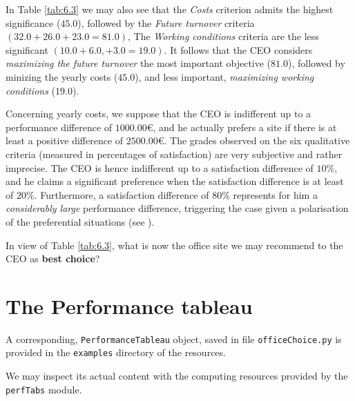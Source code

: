 In Table \ref{tab:6.3} we may also see that the \emph{Costs} criterion admits the highest significance ($45.0$), followed by the \emph{Future turnover} criteria $(32.0 + 26.0 + 23.0 = 81.0)$, The \emph{Working conditions} criteria are the less significant $(10.0 + 6.0, + 3.0 = 19.0)$. It follows that the CEO considers \emph{maximizing the future turnover} the most important objective ($81.0$), followed by minizing the yearly costs ($45.0$), and less important, \emph{maximizing working conditions} ($19.0$). 

Concerning yearly costs, we suppose that the CEO is indifferent up to a performance difference of $1000.00$€, and he actually prefers a site if there is at least a positive difference of $2500.00$€. The grades observed on the six qualitative criteria (measured in percentages of satisfaction) are very subjective and rather imprecise. The CEO is hence indifferent up to a satisfaction difference of $10\%$, and he claims a significant preference when the satisfaction difference is at least of $20\%$.  Furthermore, a satisfaction difference of $80\%$ represents for him a \emph{considerably large} performance difference, triggering the case given a polarisation of the preferential situations (see \citep{BIS-2013}). 

In view of Table \ref{tab:6.3}, what is now the office site we may recommend to the CEO as \textbf{best choice}?

\section{The \Digraph Performance tableau}
\label{sec:6.2}


A corresponding, \texttt{PerformanceTableau} object, saved in file \texttt{officeChoice.py} is provided in the \texttt{examples} directory of the \Digraph resources. 

We may inspect its actual content with the computing resources provided by the \texttt{perfTabs} module.

